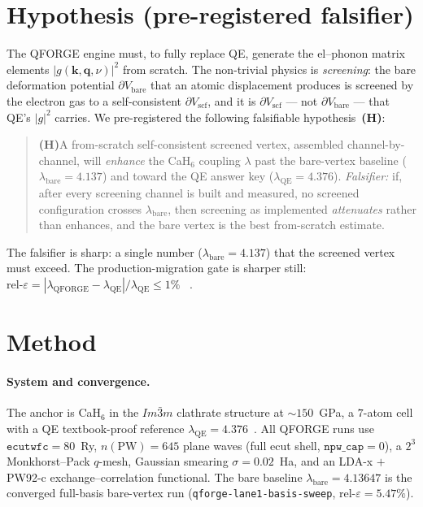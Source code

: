 \documentclass[11pt,a4paper]{article}
\begin{document}
\section{Hypothesis (pre-registered falsifier)}
\label{sec:hypothesis}

The QFORGE engine must, to fully replace QE, generate the el--phonon matrix
elements $|g(\mathbf{k},\mathbf{q},\nu)|^2$ from scratch. The non-trivial
physics is \emph{screening}: the bare deformation potential
$\partial V_{\mathrm{bare}}$ that an atomic displacement produces is screened
by the electron gas to a self-consistent $\partial V_{\mathrm{scf}}$, and it
is $\partial V_{\mathrm{scf}}$ --- not $\partial V_{\mathrm{bare}}$ --- that
QE's $|g|^2$ carries. We pre-registered the following falsifiable
hypothesis~\textbf{(H)}:

\begin{quote}
\textbf{(H)}\quad A from-scratch self-consistent screened vertex, assembled
channel-by-channel, will \emph{enhance} the CaH$_6$ coupling $\lambda$ past
the bare-vertex baseline ($\lambda_{\mathrm{bare}}=4.137$) and toward the QE
answer key ($\lambda_{\mathrm{QE}}=4.376$). \emph{Falsifier:} if, after every
screening channel is built and measured, no screened configuration crosses
$\lambda_{\mathrm{bare}}$, then screening as implemented \emph{attenuates}
rather than enhances, and the bare vertex is the best from-scratch estimate.
\end{quote}

The falsifier is sharp: a single number ($\lambda_{\mathrm{bare}}=4.137$) that
the screened vertex must exceed. The production-migration gate is sharper
still: $\mathrm{rel}\text{-}\varepsilon = |\lambda_{\mathrm{QFORGE}} -
\lambda_{\mathrm{QE}}| / \lambda_{\mathrm{QE}} \le 1\%$
~\citep{allendynes1975,eliashberg1960}.

\section{Method}
\label{sec:method}

\paragraph{System and convergence.} The anchor is CaH$_6$ in the $Im\bar{3}m$
clathrate structure at $\sim\!150$~GPa, a $7$-atom cell with a QE textbook-proof
reference $\lambda_{\mathrm{QE}} = 4.376$~\citep{wang2012cah6,li2014cah6}.
All QFORGE runs use $\mathtt{ecutwfc}=80$~Ry, $n(\mathrm{PW})=645$ plane
waves (full ecut shell, $\mathtt{npw\_cap}=0$), a $2^3$ Monkhorst--Pack
$q$-mesh, Gaussian smearing $\sigma=0.02$~Ha, and an LDA-x $+$ PW92-c
exchange--correlation functional. The bare baseline
$\lambda_{\mathrm{bare}}=4.13647$ is the converged full-basis bare-vertex run
(\texttt{qforge-lane1-basis-sweep}, $\mathrm{rel}\text{-}\varepsilon=5.47\%$).
\end{document}
